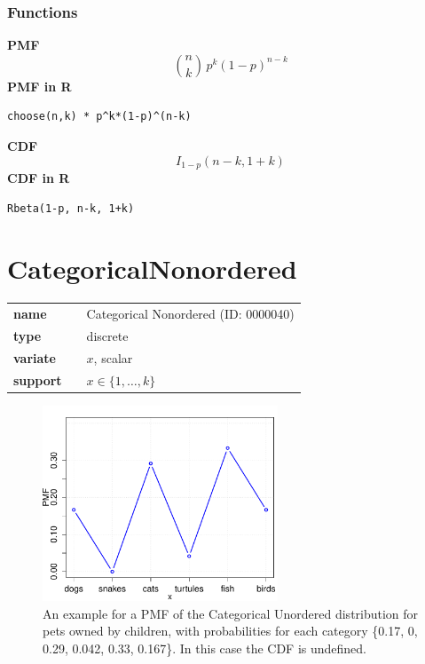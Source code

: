\subsubsection*{Functions}

\smallskip \noindent \hspace{.2cm} \textbf{PMF} 
\begin{equation*}{n \choose k}\, p^k (1-p)^{n-k}\end{equation*}
\smallskip \noindent \hspace{.2cm} \textbf{PMF in R}  
\begin{verbatim}choose(n,k) * p^k*(1-p)^(n-k)\end{verbatim}
\smallskip \noindent \hspace{.2cm} \textbf{CDF} 
\begin{equation*}I_{1-p}(n - k, 1 + k)\end{equation*}
\smallskip \noindent \hspace{.2cm} \textbf{CDF in R} 
\begin{verbatim}Rbeta(1-p, n-k, 1+k)\end{verbatim}

\smallskip\section*{CategoricalNonordered} 

  \bigskip 

\begin{tabular}{p{2cm}cl}
\textbf{name} & & Categorical Nonordered (ID: 0000040)\\ 
 
\textbf{type} & & discrete \\ 

\textbf{variate} & & $x$, scalar \\ 

\textbf{support} & & $x \in \{1,\dots,k\}$
\end{tabular}

\begin{figure}[htb!]
\centering
  \includegraphics[width=70mm]{pics/CategoricalUnOrdered_pmf_cdf.pdf}
 \caption{An example for a PMF of the Categorical Unordered distribution 
 for pets owned by children, with probabilities for each category 
 \{0.17, 0, 0.29, 0.042, 0.33, 0.167\}. In this case the CDF is undefined.}
 \label{fig:CategoricalUnOrdered_pmf_cdf}
\end{figure}


